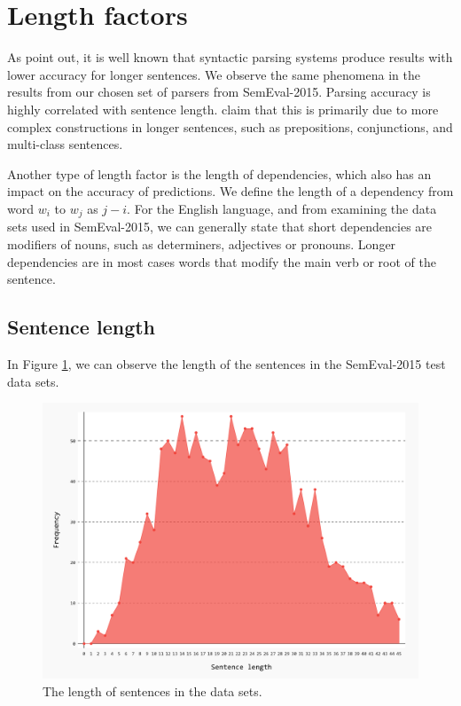 \section{Length factors}

As  point out, it is well known that syntactic parsing systems produce results with lower accuracy for longer sentences. We observe the same phenomena in the results from our chosen set of parsers from SemEval-2015. Parsing accuracy is highly correlated with sentence length.  claim that this is primarily due to more complex constructions in longer sentences, such as prepositions, conjunctions, and multi-class sentences. 

Another type of length factor is the length of dependencies, which also has an impact on the accuracy of predictions. We define the length of a dependency from word $w_i$ to $w_j$ as $j - i$. For the English language, and from examining the data sets used in SemEval-2015, we can generally state that short dependencies are modifiers of nouns, such as determiners, adjectives or pronouns. Longer dependencies are in most cases words that modify the main verb or root of the sentence. 

\subsection{Sentence length}

In Figure \ref{fig:sentence_length}, we can observe the length of the sentences in the SemEval-2015 test data sets.

\begin{figure}[h]
\centering
\includegraphics[width=\textwidth]{sentence_lengths}
\caption{The length of sentences in the data sets.}
\label{fig:sentence_length}
\end{figure}

